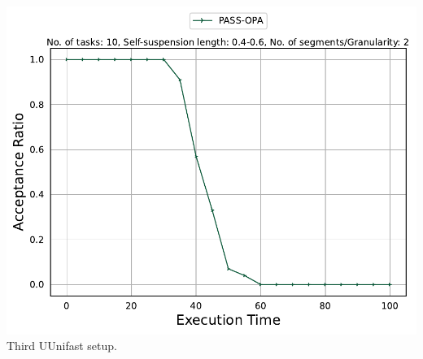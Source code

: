 \documentclass[]{article}
\begin{document}
\begin{minipage}[t]{0.48\linewidth}
		\includegraphics[width=\linewidth]{PASS-OPA[2][0.4-0.6][10].pdf}
		Third UUnifast setup.
		\vspace{0.3cm}
		
		
	\end{minipage}\hfill
\end{document}
